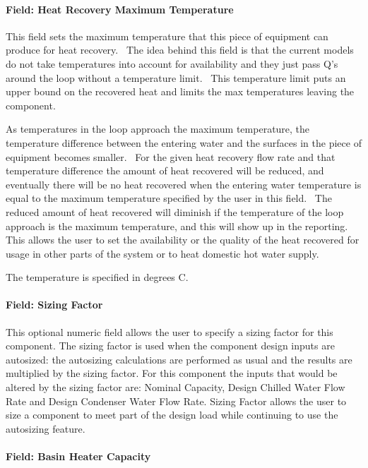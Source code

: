 \paragraph{Field: Heat Recovery Maximum Temperature}\label{field-heat-recovery-maximum-temperature-000}

This field sets the maximum temperature that this piece of equipment can produce for heat recovery.~ The idea behind this field is that the current models do not take temperatures into account for availability and they just pass Q's around the loop without a temperature limit.~ This temperature limit puts an upper bound on the recovered heat and limits the max temperatures leaving the component.

As temperatures in the loop approach the maximum temperature, the temperature difference between the entering water and the surfaces in the piece of equipment becomes smaller.~ For the given heat recovery flow rate and that temperature difference the amount of heat recovered will be reduced, and eventually there will be no heat recovered when the entering water temperature is equal to the maximum temperature specified by the user in this field.~ The reduced amount of heat recovered will diminish if the temperature of the loop approach is the maximum temperature, and this will show up in the reporting.~ This allows the user to set the availability or the quality of the heat recovered for usage in other parts of the system or to heat domestic hot water supply.

The temperature is specified in degrees C.

\paragraph{Field: Sizing Factor}\label{field-sizing-factor-7}

This optional numeric field allows the user to specify a sizing factor for this component. The sizing factor is used when the component design inputs are autosized: the autosizing calculations are performed as usual and the results are multiplied by the sizing factor. For this component the inputs that would be altered by the sizing factor are: Nominal Capacity, Design Chilled Water Flow Rate and Design Condenser Water Flow Rate. Sizing Factor allows the user to size a component to meet part of the design load while continuing to use the autosizing feature.

\paragraph{Field: Basin Heater Capacity}\label{field-basin-heater-capacity-4-000}

